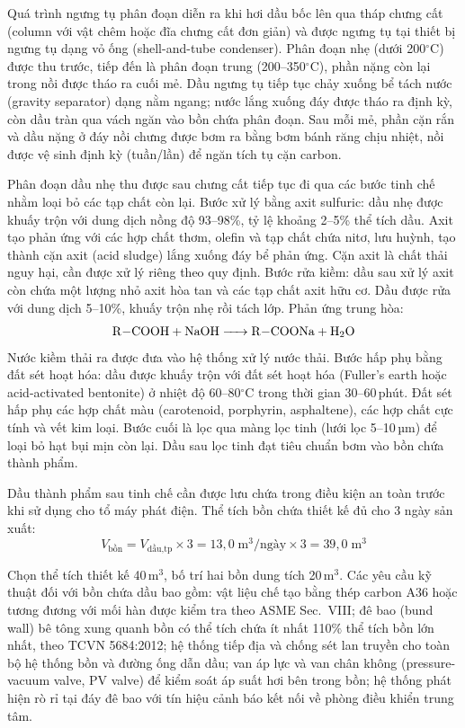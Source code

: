 \documentclass[../main.tex]{subfiles}
\begin{document}
Quá trình ngưng tụ phân đoạn diễn ra khi hơi dầu bốc lên qua tháp chưng cất (column với vật chêm hoặc đĩa chưng cất đơn giản) và được ngưng tụ tại thiết bị ngưng tụ dạng vỏ ống (shell-and-tube condenser). Phân đoạn nhẹ (dưới 200$^\circ\mathrm{C}$) được thu trước, tiếp đến là phân đoạn trung (200--350$^\circ\mathrm{C}$), phần nặng còn lại trong nồi được tháo ra cuối mẻ. Dầu ngưng tụ tiếp tục chảy xuống bể tách nước (gravity separator) dạng nằm ngang; nước lắng xuống đáy được tháo ra định kỳ, còn dầu tràn qua vách ngăn vào bồn chứa phân đoạn. Sau mỗi mẻ, phần cặn rắn và dầu nặng ở đáy nồi chưng được bơm ra bằng bơm bánh răng chịu nhiệt, nồi được vệ sinh định kỳ (tuần/lần) để ngăn tích tụ cặn carbon.

Phân đoạn dầu nhẹ thu được sau chưng cất tiếp tục đi qua các bước tinh chế nhằm loại bỏ các tạp chất còn lại. Bước xử lý bằng axit sulfuric: dầu nhẹ được khuấy trộn với dung dịch  nồng độ 93--98\%, tỷ lệ khoảng 2--5\% thể tích dầu. Axit tạo phản ứng với các hợp chất thơm, olefin và tạp chất chứa nitơ, lưu huỳnh, tạo thành cặn axit (acid sludge) lắng xuống đáy bể phản ứng. Cặn axit là chất thải nguy hại, cần được xử lý riêng theo quy định. Bước rửa kiềm: dầu sau xử lý axit còn chứa một lượng nhỏ axit hòa tan và các tạp chất axit hữu cơ. Dầu được rửa với dung dịch  5--10\%, khuấy trộn nhẹ rồi tách lớp. Phản ứng trung hòa:
\begin{equation}
  \ce{R-COOH + NaOH -> R-COONa + H2O}
\end{equation}
Nước kiềm thải ra được đưa vào hệ thống xử lý nước thải. Bước hấp phụ bằng đất sét hoạt hóa: dầu được khuấy trộn với đất sét hoạt hóa (Fuller's earth hoặc acid-activated bentonite) ở nhiệt độ 60--80$^\circ\mathrm{C}$ trong thời gian 30--60\,phút. Đất sét hấp phụ các hợp chất màu (carotenoid, porphyrin, asphaltene), các hợp chất cực tính và vết kim loại. Bước cuối là lọc qua màng lọc tinh (lưới lọc 5--10\,µm) để loại bỏ hạt bụi mịn còn lại. Dầu sau lọc tinh đạt tiêu chuẩn bơm vào bồn chứa thành phẩm.

Dầu thành phẩm sau tinh chế cần được lưu chứa trong điều kiện an toàn trước khi sử dụng cho tổ máy phát điện. Thể tích bồn chứa thiết kế đủ cho 3 ngày sản xuất:
\begin{equation}
  V_{\text{bồn}} = V_{\text{dầu,tp}} \times 3 = 13{,}0 \;\text{m}^3/\text{ngày} \times 3 = 39{,}0 \;\text{m}^3
\end{equation}

Chọn thể tích thiết kế 40\,m$^3$, bố trí hai bồn dung tích 20\,m$^3$. Các yêu cầu kỹ thuật đối với bồn chứa dầu bao gồm: vật liệu chế tạo bằng thép carbon A36 hoặc tương đương với mối hàn được kiểm tra theo ASME Sec.~VIII; đê bao (bund wall) bê tông xung quanh bồn có thể tích chứa ít nhất 110$\%$ thể tích bồn lớn nhất, theo TCVN 5684:2012; hệ thống tiếp địa và chống sét lan truyền cho toàn bộ hệ thống bồn và đường ống dẫn dầu; van áp lực và van chân không (pressure-vacuum valve, PV valve) để kiểm soát áp suất hơi bên trong bồn; hệ thống phát hiện rò rỉ tại đáy đê bao với tín hiệu cảnh báo kết nối về phòng điều khiển trung tâm.
\end{document}
